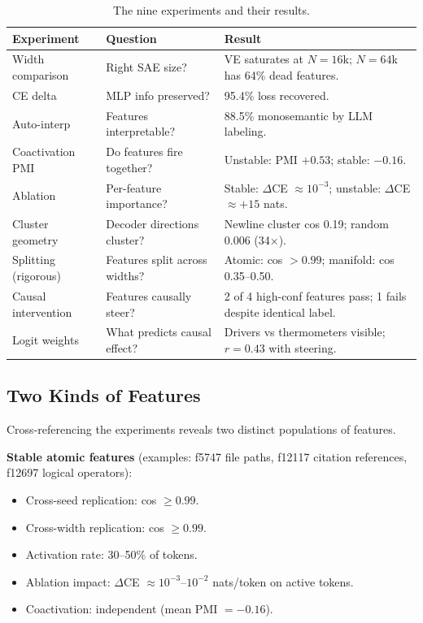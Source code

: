 \documentclass[11pt]{article}
\begin{document}
\begin{table}[h]
\centering
\caption{The nine experiments and their results.}
\label{tab:experiments}
\small
\begin{tabular}{p{2.5cm}p{4cm}p{6cm}}
\toprule
\textbf{Experiment} & \textbf{Question} & \textbf{Result} \\
\midrule
Width comparison & Right SAE size? & VE saturates at $N{=}16$k; $N{=}64$k has 64\% dead features. \\
CE delta & MLP info preserved? & 95.4\% loss recovered. \\
Auto-interp & Features interpretable? & 88.5\% monosemantic by LLM labeling. \\
Coactivation PMI & Do features fire together? & Unstable: PMI $+0.53$; stable: $-0.16$. \\
Ablation & Per-feature importance? & Stable: $\Delta$CE $\approx 10^{-3}$; unstable: $\Delta$CE $\approx +15$ nats. \\
Cluster geometry & Decoder directions cluster? & Newline cluster cos 0.19; random 0.006 (34$\times$). \\
Splitting (rigorous) & Features split across widths? & Atomic: cos $> 0.99$; manifold: cos 0.35--0.50. \\
Causal intervention & Features causally steer? & 2 of 4 high-conf features pass; 1 fails despite identical label. \\
Logit weights & What predicts causal effect? & Drivers vs thermometers visible; $r = 0.43$ with steering. \\
\bottomrule
\end{tabular}
\end{table}

\subsection{Two Kinds of Features}

Cross-referencing the experiments reveals two distinct populations of features.

\textbf{Stable atomic features} (examples: f5747 file paths, f12117 citation
references, f12697 logical operators):
\begin{itemize}[leftmargin=*]
  \item Cross-seed replication: cos $\geq 0.99$.
  \item Cross-width replication: cos $\geq 0.99$.
  \item Activation rate: 30--50\% of tokens.
  \item Ablation impact: $\Delta$CE $\approx 10^{-3}$--$10^{-2}$ nats/token on active tokens.
  \item Coactivation: independent (mean PMI $= -0.16$).
\end{itemize}
\end{document}

